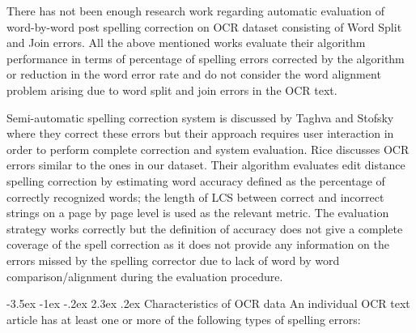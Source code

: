 \documentclass[12pt]{article}
\makeatletter
\renewcommand\section{\@startsection{section}{1}{\z@}%
                                  {-3.5ex \@plus -1ex \@minus -.2ex}%
                                  {2.3ex \@plus.2ex}%
                                  {\normalfont\bfseries}}
\makeatother
\begin{document}
There has not been enough research work regarding automatic evaluation of word-by-word post spelling correction on OCR dataset consisting of Word Split and Join errors. All the above mentioned works evaluate their algorithm performance in terms of percentage of spelling errors corrected by the algorithm or reduction in the word error rate and do not consider the word alignment problem arising due to word split and join errors in the OCR text. 

Semi-automatic spelling correction system is discussed by Taghva and Stofsky\cite{taghva2001ocrspell} where they correct these errors but their approach requires user interaction in order to perform complete correction and system evaluation. Rice\cite{rice1996measuring} discusses OCR errors similar to the ones in our dataset. Their algorithm evaluates edit distance spelling correction by estimating word accuracy defined as the percentage of correctly recognized words; the length of LCS between correct and incorrect strings on a page by page level is used as the relevant metric. The evaluation strategy works correctly but the definition of accuracy does not give a complete coverage of the spell correction as it does not provide any information on the errors missed by the spelling corrector due to lack of word by word comparison/alignment during the evaluation procedure.



\section{Characteristics of OCR data}
\label{spell:errors}
An individual OCR text article has at least one or more of the following types of spelling errors:
\end{document}
